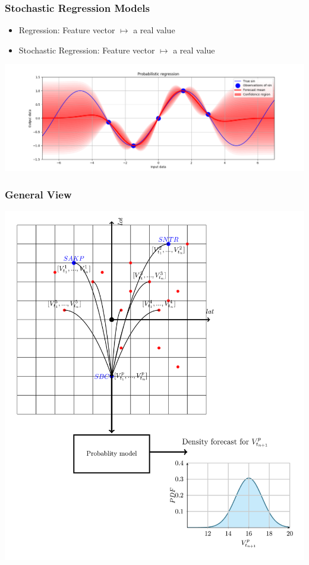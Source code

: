 \documentclass[18pt]{beamer}
\begin{document}
\begin{frame}
  \frametitle{Stochastic Regression Models}
  \begin{itemize}
  \item Regression: Feature vector $\mapsto$ a real value
  \item Stochastic Regression: Feature vector $\mapsto$ a real value
  \end{itemize}
  \includegraphics[scale=0.35]{images/probabilistic_regression}
  
\end{frame}

\begin{frame}
  \frametitle{General View}
  \begin{center}
  \includegraphics[scale=0.10]{images/general_system}
  \end{center}
\end{frame}
\end{document}
